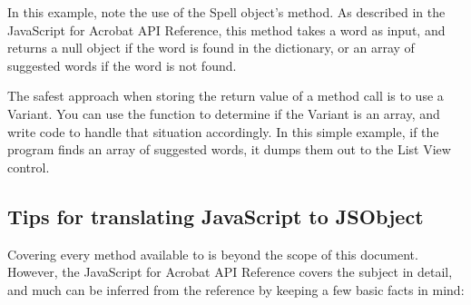 \documentclass[letterpaper,12pt,english,openany,oneside]{sphinxmanual}
\begin{document}
In this example, note the use of the Spell object’s  method. As described in the JavaScript for Acrobat API Reference, this method takes a word as input, and returns a null object if the word is found in the dictionary, or an array of suggested words if the word is not found.

The safest approach when storing the return value of a  method call is to use a Variant. You can use the  function to determine if the Variant is an array, and write code to handle that situation accordingly. In this simple example, if the program finds an array of suggested words, it dumps them out to the List View control.


\subsection{Tips for translating JavaScript to JSObject}
\label{\detokenize{IAC_DevApp_OLE_Support:tips-for-translating-javascript-to-jsobject}}
Covering every method available to  is beyond the scope of this document. However, the JavaScript for Acrobat API Reference covers the subject in detail, and much can be inferred from the reference by keeping a few basic facts in mind:
\end{document}
